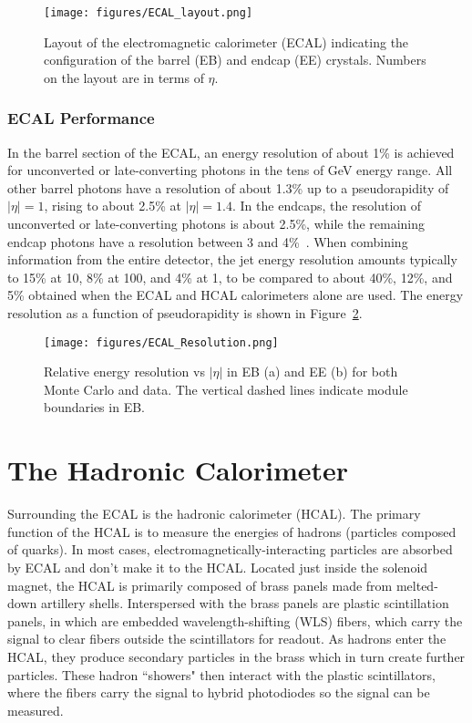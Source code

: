 \begin{figure}\centering
  \texttt{[image: figures/ECAL\_layout.png]}
  \caption{\label{fig:ECAL_layout} Layout of the electromagnetic calorimeter (ECAL) indicating the configuration of the barrel (EB) and endcap (EE) crystals. Numbers on the layout are in terms of $\eta$.}
\end{figure}

\subsubsection{ECAL Performance}

In the barrel section of the ECAL, an energy resolution of about 1\% is achieved for unconverted or late-converting photons in the tens of GeV energy range. All other barrel photons have a resolution of about 1.3\% up to a pseudorapidity of $|\eta| = 1$, rising to about 2.5\% at $|\eta| = 1.4$. In the endcaps, the resolution of unconverted or late-converting photons is about 2.5\%, while the remaining endcap photons have a resolution between 3 and 4\%~\cite{CMS:EGM-14-001}. When combining information from the entire detector, the jet energy resolution amounts typically to 15\% at 10\GeV, 8\% at 100\GeV, and 4\% at 1\TeV, to be compared to about 40\%, 12\%, and 5\% obtained when the ECAL and HCAL calorimeters alone are used. The energy resolution as a function of pseudorapidity is shown in Figure~\ref{fig:ECAL_Resolution}\cite{ECAL}.

\begin{figure}\centering
  \texttt{[image: figures/ECAL\_Resolution.png]}
  \caption{\label{fig:ECAL_Resolution} Relative energy resolution vs $|\eta|$ in EB (a) and EE (b) for both Monte Carlo and data. The vertical dashed lines indicate module boundaries in EB.}
\end{figure}





\section{The Hadronic Calorimeter}

Surrounding the ECAL is the hadronic calorimeter (HCAL). The primary function of the HCAL is to measure the energies of hadrons (particles composed of quarks). In most cases, electromagnetically-interacting particles are absorbed by ECAL and don't make it to the HCAL. Located just inside the solenoid magnet, the HCAL is primarily composed of brass panels made from melted-down artillery shells. Interspersed with the brass panels are plastic scintillation panels, in which are embedded wavelength-shifting (WLS) fibers, which carry the signal to clear fibers outside the scintillators for readout. As hadrons enter the HCAL, they produce secondary particles in the brass which in turn create further particles. These hadron ``showers" then interact with the plastic scintillators, where the fibers carry the signal to hybrid photodiodes so the signal can be measured.

